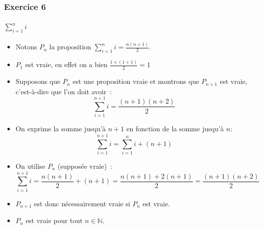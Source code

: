 \documentclass[10pt,notheorems]{beamer}
\theoremstyle{plain}
\theoremstyle{definition} %
\begin{document}
\begin{frame}
  \frametitle{Exercice 6}
  \framesubtitle{$\sum_{i=1}^n i$}
  \fontsize{8}{10}\selectfont

  \begin{itemize}

  \item Notons $P_n$ la proposition $\sum_{i=1}^n i = \frac{n(n+1)}{2}$.\newline

  \item $P_1$ est vraie, en effet on a bien $\frac{1 \times (1+1)}{2} = 1$\newline

  \item Supposons que $P_n$ est une proposition vraie et montrons que $P_{n+1}$ est vraie, c'est-à-dire  que l'on doit avoir~:
    \[
      \sum_{i=1}^{n+1} i = \frac{(n+1)(n+2)}{2}
    \]

  \item On exprime la somme jusqu'à $n+1$ en fonction de la somme jusqu'à $n$:
    \[
      \sum_{i=1}^{n+1} i = \sum_{i=1}^{n} i + (n+1)
    \]

  \item On utilise $P_n$ (supposée vraie)~:
    \[
        \sum_{i=1}^{n+1} i = \frac{n(n+1)}{2} + (n+1)
        = \frac{n(n+1)+2(n+1)}{2}
        = \frac{(n+1)(n+2)}{2}
    \]

  \item $P_{n+1}$ est donc nécessairement vraie si $P_{n}$ est vraie.\newline

  \item $P_n$ est vraie pour tout $n\in\mathbb N$.

  \end{itemize}

\end{frame}
\end{document}
